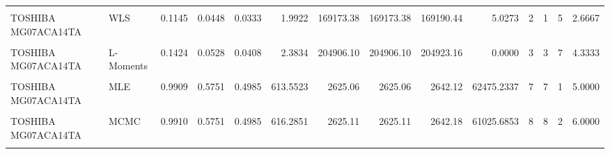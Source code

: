 \documentclass[
]{article}
\begin{document}
\begin{longtable}[t]{llrrrrrrrrrrrr}
\endfoot
\bottomrule
\endlastfoot
\cellcolor{gray!10}{TOSHIBA MG07ACA14TA} & \cellcolor{gray!10}{OLS} & \cellcolor{gray!10}{0.1375} & \cellcolor{gray!10}{0.0586} & \cellcolor{gray!10}{0.0483} & \cellcolor{gray!10}{3.0372} & \cellcolor{gray!10}{146091.89} & \cellcolor{gray!10}{146091.89} & \cellcolor{gray!10}{146108.96} & \cellcolor{gray!10}{9.8674} & \cellcolor{gray!10}{5} & \cellcolor{gray!10}{5} & \cellcolor{gray!10}{4} & \cellcolor{gray!10}{4.6667}\\
TOSHIBA MG07ACA14TA & WLS & 0.1145 & 0.0448 & 0.0333 & 1.9922 & 169173.38 & 169173.38 & 169190.44 & 5.0273 & 2 & 1 & 5 & 2.6667\\
\cellcolor{gray!10}{TOSHIBA MG07ACA14TA} & \cellcolor{gray!10}{MOM} & \cellcolor{gray!10}{0.1438} & \cellcolor{gray!10}{0.0559} & \cellcolor{gray!10}{0.0455} & \cellcolor{gray!10}{2.7008} & \cellcolor{gray!10}{213664.93} & \cellcolor{gray!10}{213664.93} & \cellcolor{gray!10}{213681.99} & \cellcolor{gray!10}{0.0000} & \cellcolor{gray!10}{4} & \cellcolor{gray!10}{4} & \cellcolor{gray!10}{8} & \cellcolor{gray!10}{5.3333}\\
TOSHIBA MG07ACA14TA & L-Moments & 0.1424 & 0.0528 & 0.0408 & 2.3834 & 204906.10 & 204906.10 & 204923.16 & 0.0000 & 3 & 3 & 7 & 4.3333\\
\cellcolor{gray!10}{TOSHIBA MG07ACA14TA} & \cellcolor{gray!10}{EPF} & \cellcolor{gray!10}{0.1465} & \cellcolor{gray!10}{0.0624} & \cellcolor{gray!10}{0.0539} & \cellcolor{gray!10}{3.4181} & \cellcolor{gray!10}{228190.01} & \cellcolor{gray!10}{228190.01} & \cellcolor{gray!10}{228207.07} & \cellcolor{gray!10}{0.0000} & \cellcolor{gray!10}{6} & \cellcolor{gray!10}{6} & \cellcolor{gray!10}{9} & \cellcolor{gray!10}{7.0000}\\
\addlinespace
TOSHIBA MG07ACA14TA & MLE & 0.9909 & 0.5751 & 0.4985 & 613.5523 & 2625.06 & 2625.06 & 2642.12 & 62475.2337 & 7 & 7 & 1 & 5.0000\\
\cellcolor{gray!10}{TOSHIBA MG07ACA14TA} & \cellcolor{gray!10}{MAP} & \cellcolor{gray!10}{0.9904} & \cellcolor{gray!10}{0.5753} & \cellcolor{gray!10}{0.4988} & \cellcolor{gray!10}{650.2219} & \cellcolor{gray!10}{2690.00} & \cellcolor{gray!10}{2690.00} & \cellcolor{gray!10}{2707.07} & \cellcolor{gray!10}{3180.7688} & \cellcolor{gray!10}{9} & \cellcolor{gray!10}{9} & \cellcolor{gray!10}{3} & \cellcolor{gray!10}{7.0000}\\
TOSHIBA MG07ACA14TA & MCMC & 0.9910 & 0.5751 & 0.4985 & 616.2851 & 2625.11 & 2625.11 & 2642.18 & 61025.6853 & 8 & 8 & 2 & 6.0000\\
\cellcolor{gray!10}{TOSHIBA MG07ACA14TA} & \cellcolor{gray!10}{Percentile} & \cellcolor{gray!10}{0.1069} & \cellcolor{gray!10}{0.0447} & \cellcolor{gray!10}{0.0363} & \cellcolor{gray!10}{2.1256} & \cellcolor{gray!10}{181286.55} & \cellcolor{gray!10}{181286.55} & \cellcolor{gray!10}{181303.61} & \cellcolor{gray!10}{5.8995} & \cellcolor{gray!10}{1} & \cellcolor{gray!10}{2} & \cellcolor{gray!10}{6} & \cellcolor{gray!10}{3.0000}\\

\end{longtable}
\end{document}
